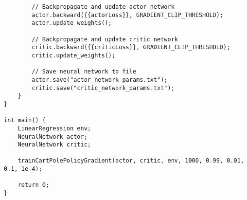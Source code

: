 \begin{verbatim}
        // Backpropagate and update actor network
        actor.backward({{actorLoss}}, GRADIENT_CLIP_THRESHOLD);
        actor.update_weights();

        // Backpropagate and update critic network
        critic.backward({{criticLoss}}, GRADIENT_CLIP_THRESHOLD);
        critic.update_weights();

        // Save neural network to file
        actor.save("actor_network_params.txt");
        critic.save("critic_network_params.txt");
    }
}

int main() {
    LinearRegression env;
    NeuralNetwork actor;
    NeuralNetwork critic;

    trainCartPolePolicyGradient(actor, critic, env, 1000, 0.99, 0.01, 0.1, 1e-4);

    return 0;
}
\end{verbatim}

